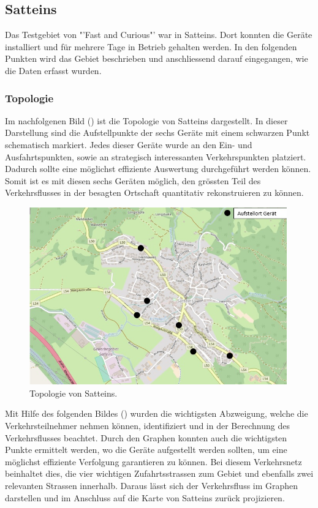 \subsection{Satteins}
Das Testgebiet von "'Fast and Curious"' war in Satteins. Dort konnten die Geräte installiert und für mehrere Tage in Betrieb gehalten werden. In den folgenden Punkten wird das Gebiet beschrieben und anschliessend darauf eingegangen, wie die Daten erfasst wurden.

\subsubsection{Topologie}
Im nachfolgenen Bild () ist die Topologie von Satteins dargestellt. In dieser Darstellung sind die Aufstellpunkte der sechs Geräte mit einem schwarzen Punkt schematisch markiert. Jedes dieser Geräte wurde an den Ein- und Ausfahrtspunkten, sowie an strategisch interessanten Verkehrspunkten platziert. Dadurch sollte eine möglichst effiziente Auswertung durchgeführt werden können. Somit ist es mit diesen sechs Geräten möglich, den grössten Teil des Verkehrsflusses in der besagten Ortschaft quantitativ rekonstruieren zu können. 

\begin{figure}[H]
  \centering
  \includegraphics[width=0.99\textwidth]{Resultate/Satteins.jpg} 
  \caption{Topologie von Satteins. \cite{satteins}}
  \label{bSatteins}
\end{figure}

Mit Hilfe des folgenden Bildes () wurden die wichtigsten Abzweigung, welche die Verkehrsteilnehmer nehmen können, identifiziert und in der Berechnung des Verkehrsflusses beachtet. Durch den Graphen konnten auch die wichtigsten Punkte ermittelt werden, wo die Geräte aufgestellt werden sollten, um eine möglichst effiziente Verfolgung garantieren zu können. Bei diesem Verkehrsnetz beinhaltet dies, die vier wichtigen Zufahrtsstrassen zum Gebiet und ebenfalls zwei relevanten Strassen innerhalb. Daraus lässt sich der Verkehrsfluss im Graphen darstellen und im Anschluss auf die Karte von Satteins zurück projizieren.

